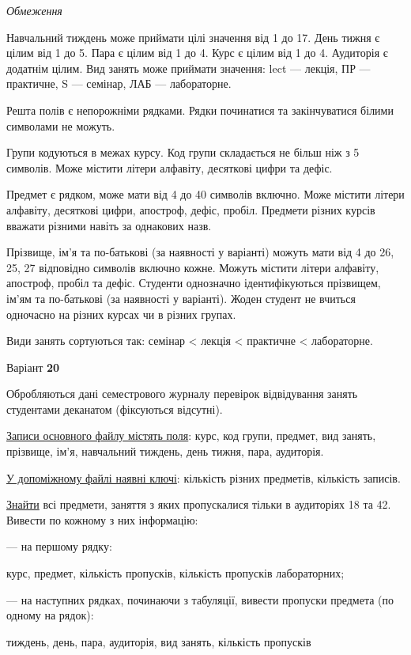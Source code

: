 \documentclass[11pt, ukrainian]{article}
\begin{document}
\bigskip\textit{Обмеження}

Навчальний тиждень може приймати цілі значення від 1 до 17.
День тижня є цілим від 1 до 5. Пара є цілим від 1 до 4.
Курс є цілим від 1 до 4. Аудиторія є додатнім цілим.
Вид занять може приймати значення:
lect --- лекція, ПР --- практичне, S --- семінар, ЛАБ --- лабораторне.

Решта полів є непорожніми рядками.
Рядки починатися та закінчуватися білими символами не можуть.

Групи кодуються в межах курсу.
Код групи складається не більш ніж з 5 символів.
Може містити літери алфавіту, десяткові цифри та дефіс.

Предмет є рядком, може мати від 4 до 40 символів включно.
Може містити літери алфавіту, десяткові цифри, апостроф, дефіс, пробіл.
Предмети різних курсів вважати різними навіть за однакових назв.

Прізвище, ім’я та по-батькові (за наявності у варіанті)
можуть мати від 4 до 26, 25, 27 відповідно символів включно кожне.
Можуть містити літери алфавіту, апостроф, пробіл та дефіс.
Студенти однозначно ідентифікуються прізвищем, ім’ям та по-батькові (за наявності у варіанті).
Жоден студент не вчиться одночасно на різних курсах чи в різних групах.

Види занять сортуються так: семінар < лекція < практичне < лабораторне.



\par
\newpage
{\center Варіант  \No \textbf { 20 }\par}
\bigskip
Обробляються дані семестрового журналу перевірок відвідування занять студентами деканатом (фіксуються відсутні). 

\underline{Записи основного файлу містять поля}: курс, код групи, предмет, вид занять, прізвище, ім’я, навчальний тиждень, день тижня, пара, аудиторія.

\underline{У допоміжному файлі наявні ключі}: кількість різних предметів, кількість записів.

\underline{Знайти} всі предмети, заняття з яких пропускалися тільки в аудиторіях 18 та 42. Вивести по кожному з них інформацію:\par
{\noindent}--- на першому рядку:\par
курс, предмет, кількість пропусків, кількість пропусків лабораторних;

{\noindent}--- на наступних рядках, починаючи з табуляції, вивести пропуски предмета (по одному на рядок):\par
тиждень, день, пара, аудиторія, вид занять, кількість пропусків
\end{document}

